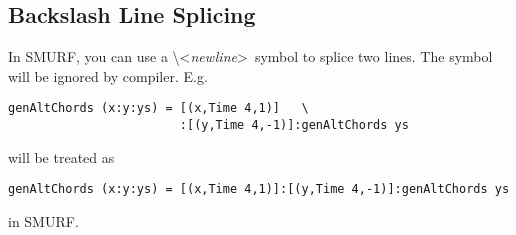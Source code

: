 \subsection{Backslash Line Splicing}
In SMURF, you can use a \textbackslash\textless{\it newline}\textgreater~{}symbol to splice two lines. The symbol
will be ignored by compiler. E.g.
\begin{lstlisting}
genAltChords (x:y:ys) = [(x,Time 4,1)]   \
                        :[(y,Time 4,-1)]:genAltChords ys
\end{lstlisting}
will be treated as 
\begin{lstlisting}
genAltChords (x:y:ys) = [(x,Time 4,1)]:[(y,Time 4,-1)]:genAltChords ys
\end{lstlisting}
in SMURF.
